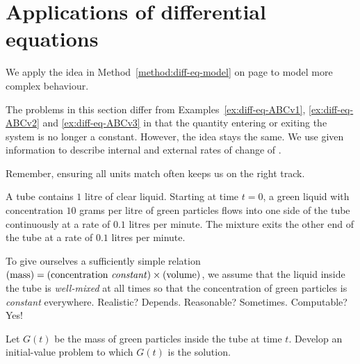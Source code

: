\documentclass[../main.tex]{subfiles}
\begin{document}
 \section{Applications of differential equations}
We apply the idea in Method~\ref{method:diff-eq-model} on page \pageref{method:diff-eq-model} to model more complex behaviour.

The problems in this section differ from Examples~\ref{ex:diff-eq-ABCv1}, \ref{ex:diff-eq-ABCv2} and \ref{ex:diff-eq-ABCv3} in that the quantity entering or exiting the system is no longer a constant. However, the idea stays the same. We use given information to describe internal and external rates of change of .

\faStar{} Remember, ensuring all units match often keeps us on the right track.

%
%

\begin{example} \label{eg:diff-eq-model-intro}
  A tube contains \(1\) litre of clear liquid. Starting at time \(t = 0\), a green liquid with concentration \(10\) grams per litre of green particles flows into one side  of the tube continuously at a rate of \(0.1\) litres per minute.  The mixture exits the other end of the tube at a rate of \(0.1\) litres per minute.

  To give ourselves a sufficiently simple relation \((\text{mass}) = (\text{concentration \emph{constant}}) \times (\text{volume})\), we assume that the liquid inside the tube is \emph{well-mixed} at all times so that the concentration of green particles is \emph{constant} everywhere. Realistic? Depends. Reasonable? Sometimes. Computable? Yes!

  Let \(G(t)\) be the mass of green particles inside the tube at time \(t\). Develop an initial-value problem to which \(G(t)\) is the solution.
  
  \blanks*
\end{example}
\clearpage
\end{document}
